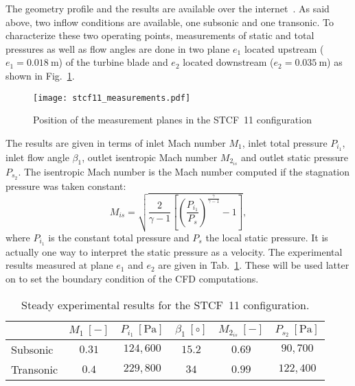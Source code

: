 The geometry profile and the results are available over the
internet~\cite{stcf11web}.
As said above, two inflow conditions are available, one subsonic and
one transonic. 
To characterize these two operating points, measurements of static and total pressures 
as well as flow angles are done in two plane $e_1$ located upstream 
($e_1 = 0.018~\text{m}$) of the turbine
blade and $e_2$ located downstream ($e_2 = 0.035~\text{m}$) as shown in Fig.~\ref{fig:stcf11_measurements}.
\begin{figure}[htbp]
  \centering
  \texttt{[image: stcf11\_measurements.pdf]}
  \caption{Position of the measurement planes in the STCF~11 configuration}
  \label{fig:stcf11_measurements}
\end{figure}
The results are given in terms of
inlet Mach number $M_1$, inlet total pressure $P_{i_1}$, 
inlet flow angle $\beta_1$, outlet isentropic
Mach number $M_{2_{is}}$ and outlet static pressure $P_{s_2}$. 
The isentropic Mach number is the Mach number 
computed if the stagnation pressure was taken constant:
\begin{equation}
    M_{is} = \sqrt{\frac{2}{\gamma -1}
        \left[\left( \frac{P_{i_1}}{P_s} \right)^{\frac{\gamma}{\gamma -1}}  
        - 1 \right]},
\end{equation}
where $P_{i_1}$ is the constant total pressure and $P_s$
the local static pressure.
It is actually
one way to interpret the static pressure as a velocity.
The experimental results measured at plane $e_1$
and $e_2$ are given in Tab.~\ref{tab:stcf11_steady_results}. 
These will be used latter on to set the boundary condition 
of the CFD computations.
\begin{table}[htbp]
   \centering
  \begin{tabular}{lccccc}
    \toprule
    \phantom{abdefghijk}& $M_1~[-]$ & $P_{i_1}~[\text{Pa}]$ & $\beta_1~[\circ]$ & $M_{2_{is}}~[-]$ & $P_{s_2}~[\text{Pa}]$ \\
    \midrule
    Subsonic & $0.31$ & $124,600$ & $15.2$ & $0.69$  & $90,700$ \\
    Transonic & $0.4$ & $229,800$ & $34$    & $0.99$ & $122,400$ \\
    \bottomrule
  \end{tabular}
  \caption{Steady experimental results for the STCF~11 configuration.}
  \label{tab:stcf11_steady_results}
\end{table} 

